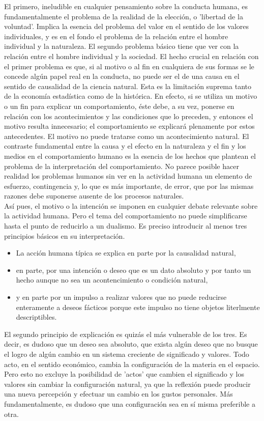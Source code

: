  El primero, ineludible en cualquier pensamiento sobre la conducta humana, es fundamentalmente el problema de la realidad de la elección, o 'libertad de la voluntad'. Implica la esencia del problema del valor en el sentido de los valores individuales, y es en el fondo el problema de la relación entre el hombre individual y la naturaleza. El segundo problema básico tiene que ver con la relación entre el hombre individual y la sociedad. El hecho crucial en relación con el primer problema es que, si al motivo o al fin en cualquiera de sus formas se le concede algún papel real en la conducta, no puede ser el de una causa en el sentido de causalidad de la ciencia natural. Esta es la limitación suprema tanto de la economía estadística como de la histórica. En efecto, si se utiliza un motivo o un fin para explicar un comportamiento, éste debe, a su vez, ponerse en relación con los acontecimientos y las condiciones que lo preceden, y entonces el motivo resulta innecesario; el comportamiento se explicará plenamente por estos antecedentes. El motivo no puede tratarse como un acontecimiento natural. El contraste fundamental entre la causa y el efecto en la naturaleza y el fin y los medios en el comportamiento humano es la esencia de los hechos que plantean el problema de la interpretación del comportamiento. No parece posible hacer realidad los problemas humanos sin ver en la actividad humana un elemento de esfuerzo, contingencia y, lo que es más importante, de error, que por las mismas razones debe suponerse ausente de los procesos naturales.\\

 Así pues, el motivo o la intención se imponen en cualquier debate relevante sobre la actividad humana. Pero el tema del comportamiento no puede simplificarse hasta el punto de reducirlo a un dualismo. Es preciso introducir al menos tres principios básicos en su interpretación. 
\begin{itemize}
    \item La acción humana típica se explica en parte por la causalidad natural, 
    \item en parte, por una intención o deseo que es un dato absoluto y por tanto un hecho aunque no sea un acontencimiento o condición natural,
    \item y en parte por un impulso a realizar valores que no puede reducirse enteramente a deseos fácticos porque este impulso no tiene objetos literlmente descriptibles.
\end{itemize}

El segundo principio de explicación es quizás el más vulnerable de los tres. Es decir, es dudoso que un deseo sea absoluto, que exista algún deseo que no busque el logro de algún cambio en un sistema creciente de significado y valores. Todo acto, en el sentido económico, cambia la configuración de la materia en el espacio. Pero esto no excluye la posibilidad de 'actos' que cambien el significado y los valores sin cambiar la configuración natural, ya que la reflexión puede producir una nueva percepción y efectuar un cambio en los gustos personales. Más fundamentalmente, es dudoso que una configuración sea en sí misma preferible a otra.\\


